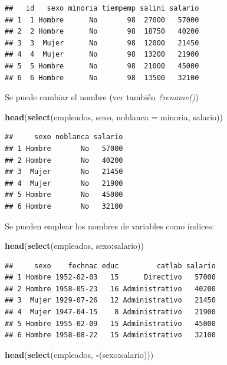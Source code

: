 \documentclass[]{book}
\newenvironment{Shaded}{\begin{snugshade}}{\end{snugshade}}
\newcommand{\KeywordTok}[1]{\textcolor[rgb]{0.13,0.29,0.53}{\textbf{#1}}}
\newcommand{\DataTypeTok}[1]{\textcolor[rgb]{0.13,0.29,0.53}{#1}}
\newcommand{\OperatorTok}[1]{\textcolor[rgb]{0.81,0.36,0.00}{\textbf{#1}}}
\newcommand{\NormalTok}[1]{#1}
\begin{document}
\begin{verbatim}
##   id   sexo minoria tiempemp salini salario
## 1  1 Hombre      No       98  27000   57000
## 2  2 Hombre      No       98  18750   40200
## 3  3  Mujer      No       98  12000   21450
## 4  4  Mujer      No       98  13200   21900
## 5  5 Hombre      No       98  21000   45000
## 6  6 Hombre      No       98  13500   32100
\end{verbatim}

Se puede cambiar el nombre (ver también \emph{?rename()})

\begin{Shaded}
\begin{Highlighting}[]
\KeywordTok{head}\NormalTok{(}\KeywordTok{select}\NormalTok{(empleados, sexo, }\DataTypeTok{noblanca =}\NormalTok{ minoria, salario))}
\end{Highlighting}
\end{Shaded}

\begin{verbatim}
##     sexo noblanca salario
## 1 Hombre       No   57000
## 2 Hombre       No   40200
## 3  Mujer       No   21450
## 4  Mujer       No   21900
## 5 Hombre       No   45000
## 6 Hombre       No   32100
\end{verbatim}

Se pueden emplear los nombres de variables como índices:

\begin{Shaded}
\begin{Highlighting}[]
\KeywordTok{head}\NormalTok{(}\KeywordTok{select}\NormalTok{(empleados, sexo}\OperatorTok{:}\NormalTok{salario))}
\end{Highlighting}
\end{Shaded}

\begin{verbatim}
##     sexo    fechnac educ         catlab salario
## 1 Hombre 1952-02-03   15      Directivo   57000
## 2 Hombre 1958-05-23   16 Administrativo   40200
## 3  Mujer 1929-07-26   12 Administrativo   21450
## 4  Mujer 1947-04-15    8 Administrativo   21900
## 5 Hombre 1955-02-09   15 Administrativo   45000
## 6 Hombre 1958-08-22   15 Administrativo   32100
\end{verbatim}

\begin{Shaded}
\begin{Highlighting}[]
\KeywordTok{head}\NormalTok{(}\KeywordTok{select}\NormalTok{(empleados, }\OperatorTok{-}\NormalTok{(sexo}\OperatorTok{:}\NormalTok{salario)))}
\end{Highlighting}
\end{Shaded}
\end{document}
